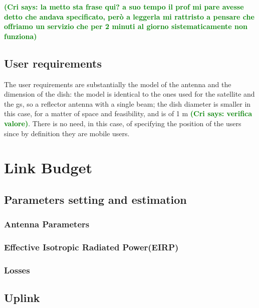 \documentclass[11pt,a4paper,titlepage]{article}
\newcommand{\cri}[1]{\textcolor{green}{\textbf{(Cri says: #1)}}}
\begin{document}
\cri{la metto sta frase qui? a suo tempo il prof mi pare avesse detto che andava specificato, però a leggerla mi rattristo a pensare che offriamo un servizio che per 2 minuti al giorno sistematicamente non funziona}
	\subsection{User requirements}
The user requirements are substantially the model of the antenna and the dimension of the dish: the model is identical to the ones used for the satellite and the \gls{gs}, so a reflector antenna with a single beam; the dish diameter is smaller in this case, for a matter of space and feasibility, and is of 1 m \cri{verifica valore}. There is no need, in this case, of specifying the position of the users since by definition they are mobile users.

\section{Link Budget}
	\subsection{Parameters setting and estimation}
		\subsubsection{Antenna Parameters}
		\subsubsection{Effective Isotropic Radiated Power(EIRP)}
		\subsubsection{Losses}
	\subsection{Uplink}
\end{document}
